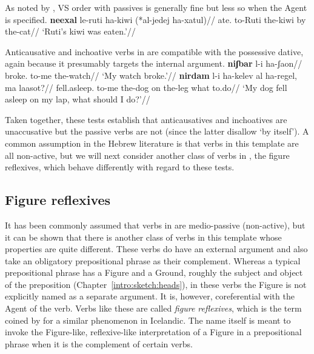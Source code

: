 As noted by \citet[148]{shlonsky87}, VS order with passives is generally fine but less so when the Agent is specified.
\ex \begingl
	\gla \textbf{neexal} le-ruti ha-kiwi (*al-jedej ha-xatul)//
	\glb ate. to-Ruti the-kiwi by the-cat//
	\glft `Ruti's kiwi was eaten.'//
	\endgl
\xe
  
Anticausative and inchoative verbs in {\tnif} are compatible with the possessive dative, again because it presumably targets the internal argument.
\pex
	\a 	\begingl
		\gla \textbf{niʃbar} l-i ha-ʃaon//
		\glb broke. to-me the-watch//
		\glft `My watch broke.'//
		\endgl
	\a 	\begingl
		\gla \textbf{nirdam} l-i ha-kelev al ha-regel, ma laasot?//
		\glb fell.asleep. to-me the-dog on the-leg what to.do//
		\glft `My dog fell asleep on my lap, what should I do?'//
		\endgl
\xe

Taken together, these tests establish that anticausatives and inchoatives are unaccusative but the passive verbs are not (since the latter disallow `by itself'). A common assumption in the Hebrew literature is that verbs in this template are all non-active, but we will next consider another class of verbs in {\tnif}, the figure reflexives, which behave differently with regard to these tests.

	\subsection{Figure reflexives} \label{vz:tnif:figrefl}
It has been commonly assumed that verbs in {\tnif} are medio-passive (non-active), but it can be shown that there is another class of verbs in this template whose properties are quite different. These verbs do have an external argument and also take an obligatory prepositional phrase as their complement. Whereas a typical prepositional phrase has a Figure and a Ground, roughly the subject and object of the preposition (Chapter~\ref{intro:sketch:heads}), in these verbs the Figure is not explicitly named as a separate argument. It is, however, coreferential with the Agent of the verb. Verbs like these are called \emph{figure reflexives}, which is the term coined by \cite{wood14nllt} for a similar phenomenon in Icelandic. The name itself is meant to invoke the Figure-like, reflexive-like interpretation of a Figure in a prepositional phrase when it is the complement of certain verbs.\label{r1:3:2}

